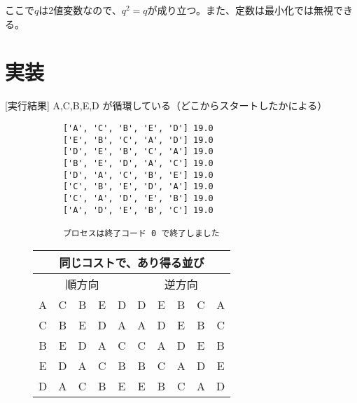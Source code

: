 ここで$q$は2値変数なので、$q^2=q$が成り立つ。また、定数は最小化では無視できる。

\section{実装}



\newpage

[実行結果] A,C,B,E,D が循環している（どこからスタートしたかによる）

\begin{figure}[h]
  \centering
  \begin{minipage}[c]{0.49\columnwidth}
    \centering
    \begin{verbatim}
      ['A', 'C', 'B', 'E', 'D'] 19.0
      ['E', 'B', 'C', 'A', 'D'] 19.0
      ['D', 'E', 'B', 'C', 'A'] 19.0
      ['B', 'E', 'D', 'A', 'C'] 19.0
      ['D', 'A', 'C', 'B', 'E'] 19.0
      ['C', 'B', 'E', 'D', 'A'] 19.0
      ['C', 'A', 'D', 'E', 'B'] 19.0
      ['A', 'D', 'E', 'B', 'C'] 19.0

      プロセスは終了コード 0 で終了しました
    \end{verbatim}
  \end{minipage}
  \begin{minipage}[c]{0.49\columnwidth}
    \centering
    \begin{tabular}{|ccccc|ccccc|}\hline
        \multicolumn{10}{|c|}{同じコストで、あり得る並び} \\\hline
        \multicolumn{5}{|c|}{順方向} & \multicolumn{5}{|c|}{逆方向} \\\hline
        A & C & B & E & D & D & E & B & C & A \\
        C & B & E & D & A & A & D & E & B & C \\
        B & E & D & A & C & C & A & D & E & B \\
        E & D & A & C & B & B & C & A & D & E \\
        D & A & C & B & E & E & B & C & A & D \\\hline
     \end{tabular}
  \end{minipage}
  \end{figure}